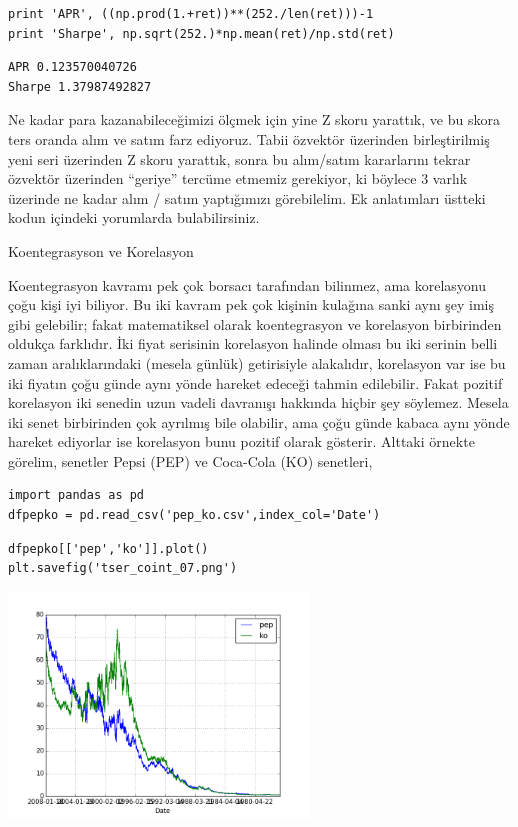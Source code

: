 \documentclass[12pt,fleqn]{article}\usepackage{../../common}
\begin{document}
\begin{verbatim}
print 'APR', ((np.prod(1.+ret))**(252./len(ret)))-1
print 'Sharpe', np.sqrt(252.)*np.mean(ret)/np.std(ret)
\end{verbatim}

\begin{verbatim}
APR 0.123570040726
Sharpe 1.37987492827
\end{verbatim}

Ne kadar para kazanabileceğimizi ölçmek için yine Z skoru yarattık, ve bu
skora ters oranda alım ve satım farz ediyoruz. Tabii özvektör üzerinden
birleştirilmiş yeni seri üzerinden Z skoru yarattık, sonra bu alım/satım
kararlarını tekrar özvektör üzerinden ``geriye'' tercüme etmemiz gerekiyor,
ki böylece 3 varlık üzerinde ne kadar alım / satım yaptığımızı
görebilelim. Ek anlatımları üstteki kodun içindeki yorumlarda
bulabilirsiniz. 

Koentegrasyson ve Korelasyon

Koentegrasyon kavramı pek çok borsacı tarafından bilinmez, ama korelasyonu
çoğu kişi iyi biliyor. Bu iki kavram pek çok kişinin kulağına sanki aynı
şey imiş gibi gelebilir; fakat matematiksel olarak koentegrasyon ve
korelasyon birbirinden oldukça farklıdır. İki fiyat serisinin korelasyon
halinde olması bu iki serinin belli zaman aralıklarındaki (mesela günlük)
getirisiyle alakalıdır, korelasyon var ise bu iki fiyatın çoğu günde aynı
yönde hareket edeceği tahmin edilebilir. Fakat pozitif korelasyon iki
senedin uzun vadeli davranışı hakkında hiçbir şey söylemez. Mesela iki
senet birbirinden çok ayrılmış bile olabilir, ama çoğu günde kabaca aynı
yönde hareket ediyorlar ise korelasyon bunu pozitif olarak
gösterir. Alttaki örnekte görelim, senetler Pepsi (PEP) ve Coca-Cola (KO) 
senetleri,

\begin{verbatim}
import pandas as pd
dfpepko = pd.read_csv('pep_ko.csv',index_col='Date')
\end{verbatim}

\begin{verbatim}
dfpepko[['pep','ko']].plot()
plt.savefig('tser_coint_07.png')
\end{verbatim}

\includegraphics[height=6cm]{tser_coint_07.png}
\end{document}
